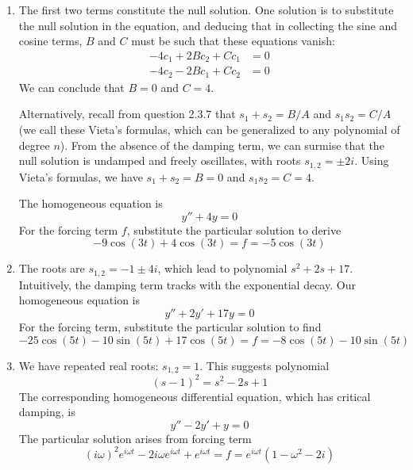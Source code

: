 \documentclass[a4paper]{article}
\begin{document}
\begin{enumerate}[label=(\alph*)]
	\item The first two terms constitute the null solution. One solution is to substitute the null solution in the equation, and deducing that in collecting the sine and cosine terms, \( B  \) and \( C  \) must be such that these equations vanish:
	\begin{align*}
		-4 c_{1} + 2B c_{2} + Cc_{1} & = 0 \\
		-4 c_{2} - 2B c_{1} + Cc_{2} & = 0 
	\end{align*}
	We can conclude that \( B = 0 \) and \( C = 4 \). 

	Alternatively, recall from question 2.3.7 that \( s_{1} + s_{2} = B/A \) and \( s_{1}s_{2} = C/A  \) (we call these Vieta's formulas, which can be generalized to any polynomial of degree \( n  \)). From the absence of the damping term, we can surmise that the null solution is undamped and freely oscillates, with roots \( s_{1,2} = \pm 2i \). Using Vieta's formulas, we have \( s_{1} + s_{2} = B = 0 \) and \( s_{1}s_{2} = C = 4 \).

	The homogeneous equation is
	\[
		y'' + 4y = 0
	\]
	For the forcing term \( f \), substitute the particular solution to derive
	\[
		 -9 \cos\!\left( 3t \right) + 4 \cos\!\left( 3t \right) = f = -5 \cos\!\left( 3t \right) 
	\]
	\item The roots are \( s_{1,2} = -1 \pm 4i \), which lead to polynomial \( s^{2} + 2s + 17 \). Intuitively, the damping term tracks with the exponential decay. Our homogeneous equation is
	\[
		 y'' + 2y' + 17y = 0
	\]
	For the forcing term, substitute the particular solution to find
	\[
		-25 \cos\!\left( 5t \right) - 10 \sin\!\left( 5t \right) + 17 \cos\!\left( 5t \right) = f = -8 \cos\!\left( 5t \right) - 10 \sin\!\left( 5t \right)  
	\]
	\item We have repeated real roots: \( s_{1,2} = 1 \). This suggests polynomial
	\[
		\!\left( s - 1 \right)^{2} = s^{2} - 2s + 1 
	\]
	The corresponding homogeneous differential equation, which has critical damping, is
	\[
		y'' - 2y' + y = 0 
	\]
	The particular solution arises from forcing term
	\[
		\!\left( i \omega  \right)^{2} e^{i \omega t } - 2 i \omega e^{i \omega t } + e^{i \omega t } = f = e^{i \omega t } \!\left( 1 - \omega^{2} - 2i \right)
	\]
\end{enumerate}

\end{document}
